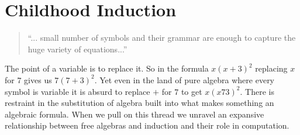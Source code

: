 \section{Childhood Induction}
\begin{quote}
``... small number
of symbols and their grammar are enough to capture the huge
variety of equations...''
\end{quote}

The point of a variable is to replace it.  So in the formula 
$x(x+3)^2$ replacing $x$ for $7$ gives us $7(7+3)^2$.  
Yet even in the land of pure algebra where every symbol is variable it is absurd to
replace $+$ for $7$ to get $x(x73)^2$.   There is restraint in the substitution
of algebra built into what makes something an algebraic formula. When we pull 
on this thread we unravel an expansive relationship between free algebras and induction
and their role in computation.


